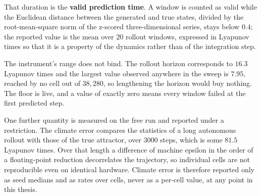 That duration is the \textbf{valid prediction time}. A window is counted as valid
while the Euclidean distance between the generated and true states, divided by
the root-mean-square norm of the z-scored three-dimensional series, stays below
$0.4$; %
the reported value is the mean over
$20$ %
rollout windows, expressed in Lyapunov times so that it is a property of the
dynamics rather than of the integration step.

The instrument's range does not bind. The rollout horizon corresponds to
$16.3$ %
Lyapunov times and the largest value observed anywhere in the sweep is
$7.95$, %
reached by no cell out of
$38{,}280$, %
so lengthening the horizon would buy nothing. The floor is live, and a value of
exactly zero means every window failed at the first predicted step.

One further quantity is measured on the free run and reported under a
restriction. The climate error compares the statistics of a long autonomous
rollout with those of the true attractor, over
$3000$ %
steps, which is some
$81.5$ %
Lyapunov times. Over that length a difference of machine epsilon in the order of
a floating-point reduction decorrelates the trajectory, so individual cells are
not reproducible even on identical hardware. Climate error is therefore reported
only as seed medians and as rates over cells, never as a per-cell value, at any
point in this thesis.





































